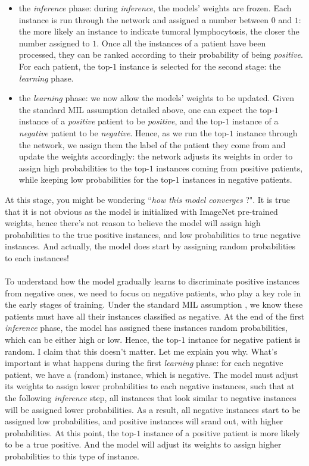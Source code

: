 \documentclass[final]{cvpr}
\begin{document}
	\begin{itemize}
		\setlength\itemsep{-.0em}
		\item the \emph{inference} phase: during \emph{inference}, the models' weights are frozen. Each instance is run through the network and assigned a number between $0$ and $1$: the more likely an instance to indicate tumoral lymphocytosis, the closer the number assigned to $1$. Once all the instances of a patient have been processed, they can be ranked according to their probability of being \emph{positive}. For each patient, the top-$1$ instance is selected for the second stage: the \emph{learning} phase.
		\item the \emph{learning} phase: we now allow the models' weights to be updated. Given the standard MIL assumption detailed above, one can expect the top-$1$ instance of a \emph{positive} patient to be \emph{positive}, and the top-$1$ instance of a \emph{negative} patient to be \emph{negative}. Hence, as we run the top-$1$ instance through the network, we assign them the label of the patient they come from and update the weights accordingly: the network adjusts its weights in order to assign high probabilities to the top-$1$ instances coming from positive patients, while keeping low probabilities for the top-$1$ instances in negative patients. 
	\end{itemize}
	\noindent
	 At this stage, you might be wondering ``\textit{how this model converges} ?". It is true that it is not obvious as the model is initialized with ImageNet pre-trained weights, hence there's not reason to believe the model will assign high probabilities to the true positive instances, and low probabilities to true negative instances. And actually, the model does start by assigning random probabilities to each instances!  \\
	 \\
	 To understand how the model gradually learns to discriminate positive instances from negative ones, we need to focus on negative patients, who play a key role in the early stages of training. Under the standard MIL assumption , we know these patients must have all their instances classified as negative. At the end of the first \textit{inference} phase, the model has assigned these instances random probabilities, which can be either high or low. Hence, the top-$1$ instance for negative patient is random. I claim that this doesn't matter. Let me explain you why. What's important is what happens during the first \textit{learning} phase: for each negative patient, we have a (random) instance, which is negative. The model must adjust its weights to assign lower probabilities to each negative instances, such that at the following \textit{inference} step, all instances that look similar to negative instances will be assigned lower probabilities. As a result, all negative instances start to be assigned low probabilities, and positive instances will srand out, with higher probabilities. At this point, the top-$1$ instance of a positive patient is more likely to be a true positive. And the model will adjust its weights to assign higher probabilities to this type of instance.\\
\end{document}
